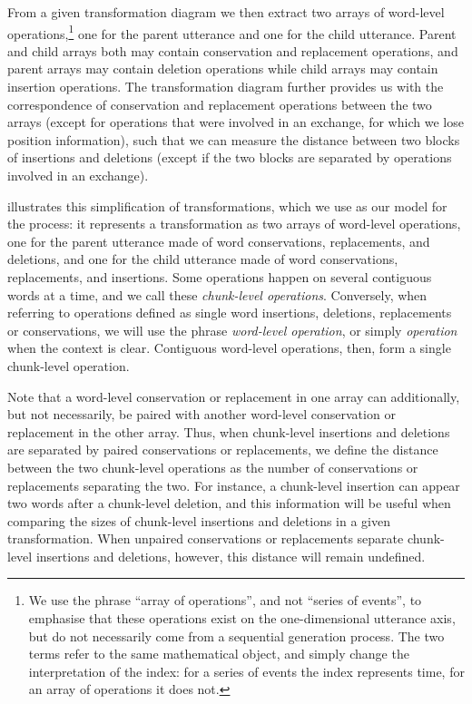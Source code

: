 From a given transformation diagram we then extract two arrays of
word-level operations,\footnote{We use the phrase \enquote{array of
  operations}, and not \enquote{series of events}, to emphasise that
  these operations exist on the one-dimensional utterance axis, but do
  not necessarily come from a sequential generation process. The two
  terms refer to the same mathematical object, and simply change the
  interpretation of the index: for a series of events the index
  represents time, for an array of operations it does not.} one for the
parent utterance and one for the child utterance. Parent and child
arrays both may contain conservation and replacement operations, and
parent arrays may contain deletion operations while child arrays may
contain insertion operations. The transformation diagram further
provides us with the correspondence of conservation and replacement
operations between the two arrays (except for operations that were
involved in an exchange, for which we lose position information), such
that we can measure the distance between two blocks of insertions and
deletions (except if the two blocks are separated by operations involved
in an exchange).

 illustrates this simplification of
transformations, which we use as our model for the process: it
represents a transformation as two arrays of word-level operations, one
for the parent utterance made of word conservations, replacements, and
deletions, and one for the child utterance made of word conservations,
replacements, and insertions. Some operations happen on several
contiguous words at a time, and we call these \emph{chunk-level
operations}. Conversely, when referring to operations defined as single
word insertions, deletions, replacements or conservations, we will use
the phrase \emph{word-level operation}, or simply \emph{operation} when
the context is clear. Contiguous word-level operations, then, form a
single chunk-level operation.

Note that a word-level conservation or replacement in one array can
additionally, but not necessarily, be paired with another word-level
conservation or replacement in the other array. Thus, when chunk-level
insertions and deletions are separated by paired conservations or
replacements, we define the distance between the two chunk-level
operations as the number of conservations or replacements separating the
two. For instance, a chunk-level insertion can appear two words after a
chunk-level deletion, and this information will be useful when comparing
the sizes of chunk-level insertions and deletions in a given
transformation. When unpaired conservations or replacements separate
chunk-level insertions and deletions, however, this distance will remain
undefined.

